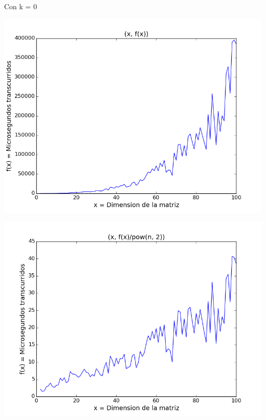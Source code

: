 \vspace{2mm}

Con k = 0

\begin{center}
\includegraphics[scale=0.54]{images/0potenciafuncion}
\end{center}


\begin{center}
\includegraphics[scale=0.54]{images/0potenciasobrecuadrado}
\end{center}


